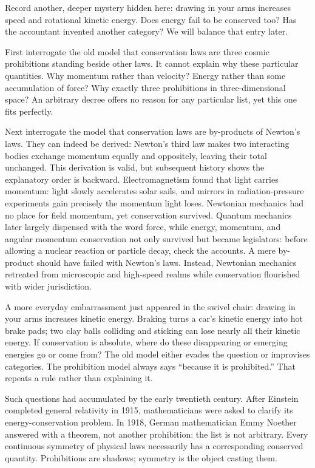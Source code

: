 Record another, deeper mystery hidden here: drawing in your arms increases speed and rotational kinetic energy. Does energy fail to be conserved too? Has the accountant invented another category? We will balance that entry later.


First interrogate the old model that conservation laws are three cosmic prohibitions standing beside other laws. It cannot explain why these particular quantities. Why momentum rather than velocity? Energy rather than some accumulation of force? Why exactly three prohibitions in three-dimensional space? An arbitrary decree offers no reason for any particular list, yet this one fits perfectly.

Next interrogate the model that conservation laws are by-products of Newton's laws. They can indeed be derived: Newton's third law makes two interacting bodies exchange momentum equally and oppositely, leaving their total unchanged. This derivation is valid, but subsequent history shows the explanatory order is backward. Electromagnetism found that light carries momentum: light slowly accelerates solar sails, and mirrors in radiation-pressure experiments gain precisely the momentum light loses. Newtonian mechanics had no place for field momentum, yet conservation survived. Quantum mechanics later largely dispensed with the word force, while energy, momentum, and angular momentum conservation not only survived but became legislators: before allowing a nuclear reaction or particle decay, check the accounts. A mere by-product should have failed with Newton's laws. Instead, Newtonian mechanics retreated from microscopic and high-speed realms while conservation flourished with wider jurisdiction.

A more everyday embarrassment just appeared in the swivel chair: drawing in your arms increases kinetic energy. Braking turns a car's kinetic energy into hot brake pads; two clay balls colliding and sticking can lose nearly all their kinetic energy. If conservation is absolute, where do these disappearing or emerging energies go or come from? The old model either evades the question or improvises categories. The prohibition model always says ``because it is prohibited.'' That repeats a rule rather than explaining it.

Such questions had accumulated by the early twentieth century. After Einstein completed general relativity in 1915, mathematicians were asked to clarify its energy-conservation problem. In 1918, German mathematician Emmy Noether answered with a theorem, not another prohibition: the list is not arbitrary. Every continuous symmetry of physical laws necessarily has a corresponding conserved quantity. Prohibitions are shadows; symmetry is the object casting them.

